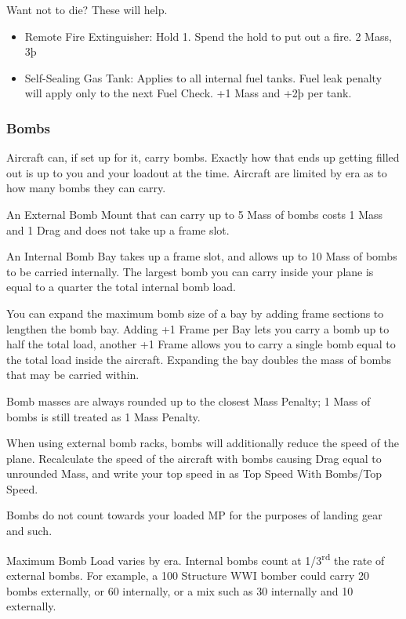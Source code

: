 \documentclass{article}
\begin{document}
Want not to die? These will help.

\begin{itemize}
  \item          Remote Fire Extinguisher: Hold 1. Spend the hold to put out a
        fire. 2 Mass, 3þ
  \item          Self-Sealing Gas Tank: Applies to all internal fuel tanks. Fuel
        leak penalty will apply only to the next Fuel Check. +1 Mass and +2þ
        per tank.
\end{itemize}

\subsubsection{Bombs}
\label{_Bombs}

Aircraft can, if set up for it, carry bombs. Exactly how that ends up
getting filled out is up to you and your loadout at the time. Aircraft
are limited by era as to how many bombs they can carry.

An External Bomb Mount that can carry up to 5 Mass of bombs costs 1 Mass
and 1 Drag and does not take up a frame slot.

An Internal Bomb Bay takes up a frame slot, and allows up to 10 Mass of
bombs to be carried internally. The largest bomb you can carry inside
your plane is equal to a quarter the total internal bomb load.

You can expand the maximum bomb size of a bay by adding frame sections
to lengthen the bomb bay. Adding +1 Frame per Bay lets you carry a bomb
up to half the total load, another +1 Frame allows you to carry a single
bomb equal to the total load inside the aircraft. Expanding the bay
doubles the mass of bombs that may be carried within.

Bomb masses are always rounded up to the closest Mass Penalty; 1 Mass of
bombs is still treated as 1 Mass Penalty.

When using external bomb racks, bombs will additionally reduce the speed
of the plane. Recalculate the speed of the aircraft with bombs causing
Drag equal to unrounded Mass, and write your top speed in as Top Speed
With Bombs/Top Speed.

Bombs do not count towards your loaded MP for the purposes of landing
gear and such.

Maximum Bomb Load varies by era. Internal bombs count at
1/3\textsuperscript{rd} the rate of external bombs. For example, a 100
Structure WWI bomber could carry 20 bombs externally, or 60 internally,
or a mix such as 30 internally and 10 externally.
\end{document}
